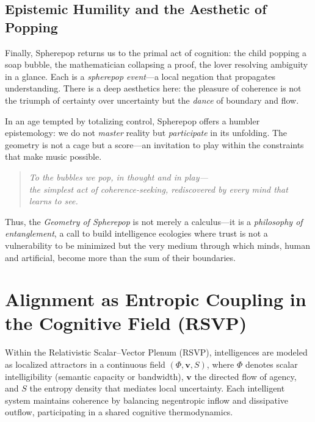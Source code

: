 \documentclass[12pt]{article}
\begin{document}
\subsection*{Epistemic Humility and the Aesthetic of Popping}

Finally, Spherepop returns us to the primal act of cognition: the child popping a soap bubble, the mathematician collapsing a proof, the lover resolving ambiguity in a glance. Each is a \emph{spherepop event}---a local negation that propagates understanding. There is a deep aesthetics here: the pleasure of coherence is not the triumph of certainty over uncertainty but the \emph{dance} of boundary and flow.

In an age tempted by totalizing control, Spherepop offers a humbler epistemology: we do not \emph{master} reality but \emph{participate} in its unfolding. The geometry is not a cage but a score---an invitation to play within the constraints that make music possible.

\begin{quote}
\itshape
To the bubbles we pop, in thought and in play---\\
the simplest act of coherence-seeking, rediscovered by every mind that learns to see.
\end{quote}

Thus, the \emph{Geometry of Spherepop} is not merely a calculus---it is a \emph{philosophy of entanglement}, a call to build intelligence ecologies where trust is not a vulnerability to be minimized but the very medium through which minds, human and artificial, become more than the sum of their boundaries.



\appendix
\section{Alignment as Entropic Coupling in the Cognitive Field (RSVP)}

Within the Relativistic Scalar–Vector Plenum (RSVP), intelligences are modeled as localized attractors in a continuous field \((\Phi,\mathbf{v},S)\), where \(\Phi\) denotes scalar intelligibility (semantic capacity or bandwidth), \(\mathbf{v}\) the directed flow of agency, and \(S\) the entropy density that mediates local uncertainty. Each intelligent system maintains coherence by balancing negentropic inflow and dissipative outflow, participating in a shared cognitive thermodynamics.
\end{document}
